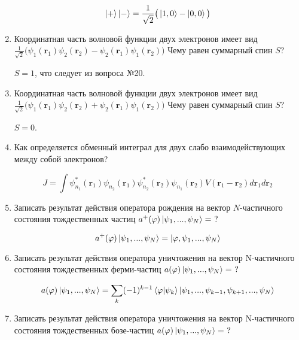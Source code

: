 \documentclass{article}
\begin{document}
\begin{enumerate}
	\begin{equation}
		\ket{+} \ket{-} = \frac{1}{\sqrt{2}} \big( \ket{1,0} - \ket{0,0} \big)
	\end{equation}
	
	\item {Координатная часть волновой функции двух электронов имеет вид
$\frac{1}{\sqrt{2}}\big( \psi_1(\textbf{r}_1) \psi_2(\textbf{r}_2) - \psi_2(\textbf{r}_1) \psi_1(\textbf{r}_2) \big)$ Чему равен суммарный спин $S$?}

	$S = 1$, что следует из вопроса №20.
	
	\item {Координатная часть волновой функции двух электронов имеет вид
$\frac{1}{\sqrt{2}}\big( \psi_1(\textbf{r}_1) \psi_2(\textbf{r}_2) + \psi_2(\textbf{r}_1) \psi_1(\textbf{r}_2) \big)$ Чему равен суммарный спин $S$?}

	$S=0$.	
	
	\item {Как определяется обменный интеграл для двух слабо взаимодействующих между собой электронов?}
	
	\begin{equation}
		J = \int \psi_{n_1}^*(\textbf{r}_1) \psi_{n_2}(\textbf{r}_1) \psi_{n_2}^*(\textbf{r}_2) \psi_{n_1}(\textbf{r}_2) V(\textbf{r}_1 - \textbf{r}_2) d\textbf{r}_1 d\textbf{r}_2
	\end{equation}
	
	\item {Записать результат действия оператора рождения на вектор $N$-частичного состояния тождественных частиц $a^+(\varphi)\ket{\psi_1, . . . , \psi_N} = \ ?$}
	
	\begin{equation}
		a^+(\varphi)\ket{\psi_1, . . . , \psi_N} = \ket{\varphi,\psi_1, . . . , \psi_N}
	\end{equation}
	
	\item {Записать результат действия оператора уничтожения на вектор N-частичного состояния тождественных ферми-частиц $a(\varphi)\ket{\psi_1, . . . , \psi_N} = \ ?$}
	
	\begin{equation}
		a(\varphi)\ket{\psi_1, . . . , \psi_N} = \sum\limits_{k} (-1)^{k-1} \braket{\varphi|\psi_k} \ket{\psi_1,...,\psi_{k-1},\psi_{k+1},...,\psi_N}
	\end{equation}
	
	\item {Записать результат действия оператора уничтожения на вектор N-частичного состояния тождественных бозе-частиц $a(\varphi)\ket{\psi_1, . . . , \psi_N} = \ ?$}
	

\end{enumerate}
\end{document}

